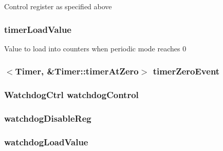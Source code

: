 \label{classCpuLocalTimer_1_1Timer_a8a303fd4c61e6f2ad203b3996137bf29}
Control register as specified above \hypertarget{classCpuLocalTimer_1_1Timer_ab938cbb5083da16d0b1be708229eca72}{
\subsubsection[{timerLoadValue}]{ {\bf timerLoadValue}}}
\label{classCpuLocalTimer_1_1Timer_ab938cbb5083da16d0b1be708229eca72}
Value to load into counters when periodic mode reaches 0 \hypertarget{classCpuLocalTimer_1_1Timer_aef3335c9e81dcad22a8575d136b7f21a}{
\subsubsection[{timerZeroEvent}]{$<${\bf Timer}, \&Timer::timerAtZero$>$ {\bf timerZeroEvent}}}
\label{classCpuLocalTimer_1_1Timer_aef3335c9e81dcad22a8575d136b7f21a}
\hypertarget{classCpuLocalTimer_1_1Timer_a650e1bd041426285d219374bb934b21d}{
\subsubsection[{watchdogControl}]{\setlength{\rightskip}{0pt plus 5cm}WatchdogCtrl {\bf watchdogControl}}}
\label{classCpuLocalTimer_1_1Timer_a650e1bd041426285d219374bb934b21d}
\hypertarget{classCpuLocalTimer_1_1Timer_a51372d5fcba85069b5e5bba466ec6832}{
\subsubsection[{watchdogDisableReg}]{ {\bf watchdogDisableReg}}}
\label{classCpuLocalTimer_1_1Timer_a51372d5fcba85069b5e5bba466ec6832}
\hypertarget{classCpuLocalTimer_1_1Timer_a1bc95b558c126e9393d024f8f7631549}{
\subsubsection[{watchdogLoadValue}]{ {\bf watchdogLoadValue}}}
